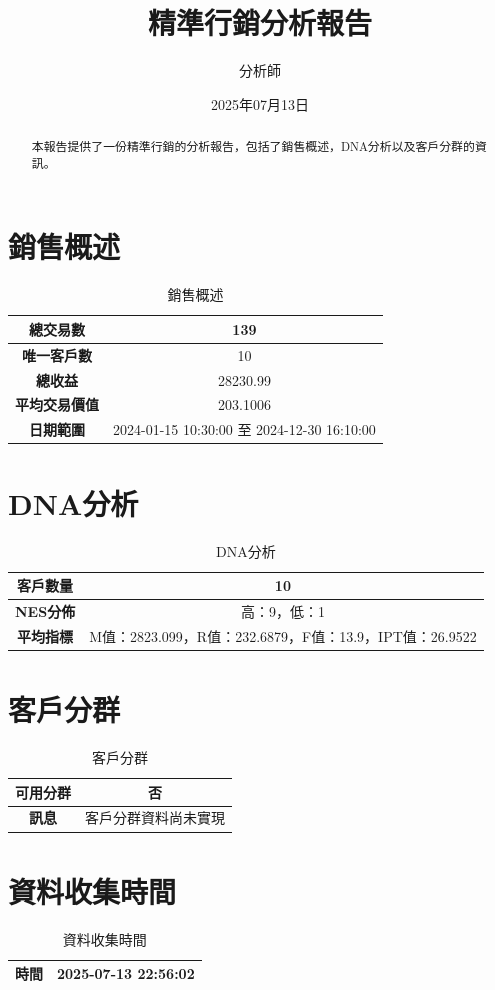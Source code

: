 \documentclass[12pt]{article}
\title{精準行銷分析報告}
\author{分析師}
\date{2025年07月13日}
\begin{document}
\maketitle
\begin{abstract}
本報告提供了一份精準行銷的分析報告，包括了銷售概述，DNA分析以及客戶分群的資訊。
\end{abstract}
\section{銷售概述}
\begin{table}[H]
\centering
\begin{tabular}{|c|c|}
\hline
\textbf{總交易數} & 139 \\
\hline
\textbf{唯一客戶數} & 10 \\
\hline
\textbf{總收益} & 28230.99 \\
\hline
\textbf{平均交易價值} & 203.1006 \\
\hline
\textbf{日期範圍} & 2024-01-15 10:30:00 至 2024-12-30 16:10:00 \\
\hline
\end{tabular}
\caption{銷售概述}
\end{table}

\section{DNA分析}
\begin{table}[H]
\centering
\begin{tabular}{|c|c|}
\hline
\textbf{客戶數量} & 10 \\
\hline
\textbf{NES分佈} & 高：9，低：1 \\
\hline
\textbf{平均指標} & M值：2823.099，R值：232.6879，F值：13.9，IPT值：26.9522 \\
\hline
\end{tabular}
\caption{DNA分析}
\end{table}

\section{客戶分群}
\begin{table}[H]
\centering
\begin{tabular}{|c|c|}
\hline
\textbf{可用分群} & 否 \\
\hline
\textbf{訊息} & 客戶分群資料尚未實現 \\
\hline
\end{tabular}
\caption{客戶分群}
\end{table}

\section{資料收集時間}
\begin{table}[H]
\centering
\begin{tabular}{|c|c|}
\hline
\textbf{時間} & 2025-07-13 22:56:02 \\
\hline
\end{tabular}
\caption{資料收集時間}
\end{table}
\end{document}
